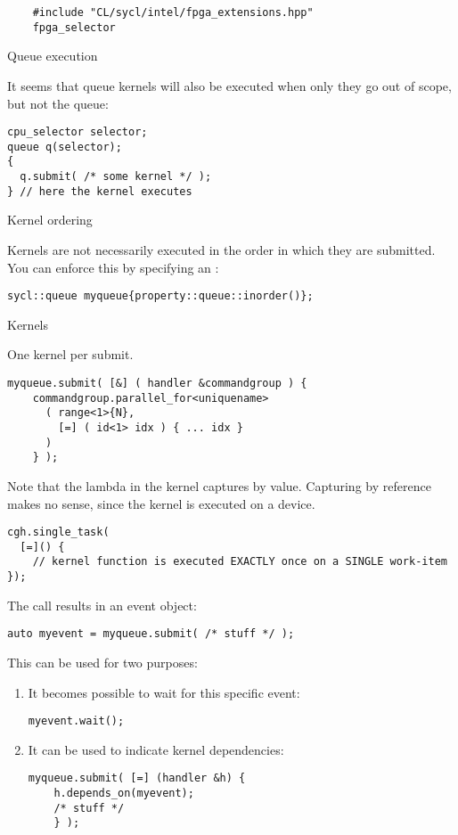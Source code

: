 \begin{dpcppnote}
  \begin{lstlisting}
    #include "CL/sycl/intel/fpga_extensions.hpp"
    fpga_selector
  \end{lstlisting}
\end{dpcppnote}

 {Queue execution}

It seems that queue kernels will also be executed when only they
go out of scope, but not the queue:
\begin{lstlisting}
cpu_selector selector;
queue q(selector);
{
  q.submit( /* some kernel */ );
} // here the kernel executes
\end{lstlisting}

 {Kernel ordering}

Kernels are not necessarily executed in the order in which they are submitted.
You can enforce this by specifying an :
\begin{lstlisting}
sycl::queue myqueue{property::queue::inorder()};
\end{lstlisting}

 {Kernels}

One kernel per submit.

\begin{lstlisting}
myqueue.submit( [&] ( handler &commandgroup ) {
    commandgroup.parallel_for<uniquename> 
      ( range<1>{N},
        [=] ( id<1> idx ) { ... idx }
      )
    } );
\end{lstlisting}

Note that the lambda in the kernel captures by value.
Capturing by reference makes no sense,
since the kernel is executed on a device.

\begin{lstlisting}
cgh.single_task(
  [=]() {
    // kernel function is executed EXACTLY once on a SINGLE work-item
});
\end{lstlisting}

The  call results in an event object:
\begin{lstlisting}
auto myevent = myqueue.submit( /* stuff */ );
\end{lstlisting}
This can be used for two purposes:
\begin{enumerate}
\item It becomes possible to wait for this specific event:
\begin{lstlisting}
myevent.wait();    
\end{lstlisting}
\item It can be used to indicate kernel dependencies:
\begin{lstlisting}
myqueue.submit( [=] (handler &h) {
    h.depends_on(myevent);
    /* stuff */
    } );
\end{lstlisting}
\end{enumerate}

